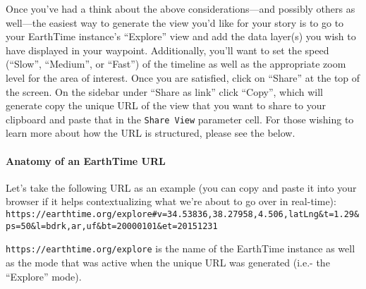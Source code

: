 \documentclass[
  12pt,
]{krantz}
\begin{document}
Once you've had a think about the above considerations---and possibly others as well---the easiest way to generate the view you'd like for your story is to go to your EarthTime instance's ``Explore'' view and add the data layer(s) you wish to have displayed in your waypoint. Additionally, you'll want to set the speed (``Slow'', ``Medium'', or ``Fast'') of the timeline as well as the appropriate zoom level for the area of interest. Once you are satisfied, click on ``Share'' at the top of the screen. On the sidebar under ``Share as link'' click ``Copy'', which will generate copy the unique URL of the view that you want to share to your clipboard and paste that in the \texttt{Share\ View} parameter cell. For those wishing to learn more about how the URL is structured, please see the below.

\hypertarget{anatomy-of-an-earthtime-url}{%
\paragraph*{Anatomy of an EarthTime URL}\label{anatomy-of-an-earthtime-url}}

Let's take the following URL as an example (you can copy and paste it into your browser if it helps contextualizing what we're about to go over in real-time): \texttt{https://earthtime.org/explore\#v=34.53836,38.27958,4.506,latLng\&t=1.29\&ps=50\&l=bdrk,ar,uf\&bt=20000101\&et=20151231}

\texttt{https://earthtime.org/explore} is the name of the EarthTime instance as well as the mode that was active when the unique URL was generated (i.e.- the ``Explore'' mode).
\end{document}

